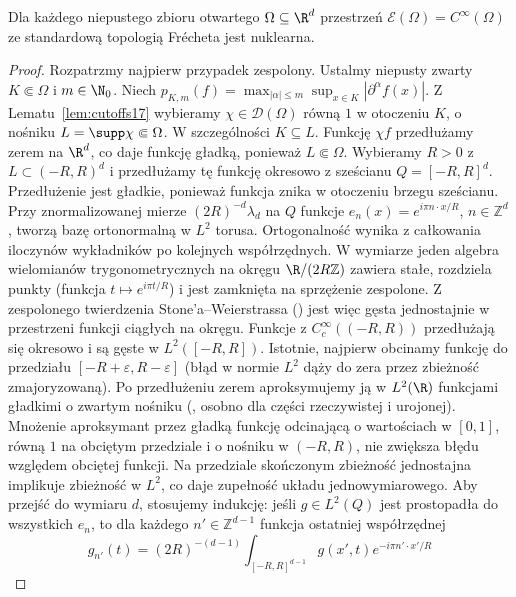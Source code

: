 \begin{twierdzenie}
\label{thm:nuclear-cinfty23}
Dla każdego niepustego zbioru otwartego $\Omega\subseteq\R^d$
przestrzeń $\mathcal E(\Omega)=C^\infty(\Omega)$
ze standardową topologią Frécheta jest nuklearna.
\end{twierdzenie}
\begin{proof}
Rozpatrzmy najpierw przypadek zespolony. Ustalmy
niepusty zwarty $K\Subset\Omega$ i $m\in\N_0$.
Niech $p_{K,m}(f)=\max_{|\alpha|\le m}\sup_{x\in K}
|\partial^\alpha f(x)|$. Z Lematu~\ref{lem:cutoffs17}
wybieramy $\chi\in\mathcal D(\Omega)$ równą $1$
w otoczeniu $K$, o nośniku $L=\supp\chi\Subset\Omega$.
W szczególności $K\subseteq L$. Funkcję $\chi f$
przedłużamy zerem na $\R^d$, co daje funkcję gładką,
ponieważ $L\Subset\Omega$.
Wybieramy $R>0$ z $L\subset(-R,R)^d$ i przedłużamy
tę funkcję okresowo z sześcianu $Q=[-R,R]^d$.
Przedłużenie jest gładkie, ponieważ funkcja znika
w otoczeniu brzegu sześcianu.
Przy znormalizowanej mierze $(2R)^{-d}\lambda_d$
na $Q$ funkcje $e_n(x)=e^{i\pi n\cdot x/R}$,
$n\in\mathbb Z^d$, tworzą bazę ortonormalną w $L^2$
torusa. Ortogonalność wynika z całkowania iloczynów
wykładników po kolejnych współrzędnych. W wymiarze
jeden algebra wielomianów trygonometrycznych na okręgu
$\R/(2R\mathbb Z)$ zawiera stałe, rozdziela punkty
(funkcja $t\mapsto e^{i\pi t/R}$) i jest zamknięta
na sprzężenie zespolone. Z zespolonego twierdzenia
Stone'a--Weierstrassa
()
jest więc gęsta jednostajnie w przestrzeni funkcji
ciągłych na okręgu. Funkcje z $C_c^\infty((-R,R))$
przedłużają się okresowo i są gęste w $L^2([-R,R])$.
Istotnie, najpierw obcinamy funkcję do przedziału
$[-R+\varepsilon,R-\varepsilon]$ (błąd w normie
$L^2$ dąży do zera przez zbieżność zmajoryzowaną).
Po przedłużeniu zerem aproksymujemy ją w $L^2(\R)$
funkcjami gładkimi o zwartym nośniku
(,
osobno dla części rzeczywistej i urojonej).
Mnożenie aproksymant przez gładką funkcję odcinającą
o wartościach w $[0,1]$, równą $1$ na obciętym
przedziale i o nośniku w $(-R,R)$, nie zwiększa błędu
względem obciętej funkcji. Na przedziale skończonym
zbieżność jednostajna implikuje zbieżność w $L^2$,
co daje zupełność układu jednowymiarowego.
Aby przejść do wymiaru $d$, stosujemy indukcję:
jeśli $g\in L^2(Q)$ jest prostopadła do wszystkich
$e_n$, to dla każdego $n'\in\mathbb Z^{d-1}$
funkcja ostatniej współrzędnej
\[
 g_{n'}(t)=(2R)^{-(d-1)}
 \int_{[-R,R]^{d-1}}g(x',t)e^{-i\pi n'\cdot x'/R}
\]
\end{proof}
